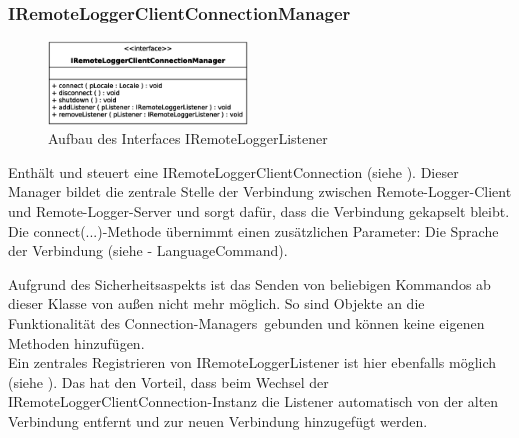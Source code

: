 \vspace{-5px}
\subsubsection{IRemoteLoggerClientConnectionManager}
\begin{figure}
	\vspace{-20px} \hspace{5px}
	\includegraphics[width=200px]{../img/CD-IRemoteLoggerClientConnectionManager.eps}
	\caption{Aufbau des Interfaces \glqq IRemoteLoggerListener\grqq}
\end{figure}
\par Enthält und steuert eine IRemoteLoggerClientConnection (siehe ). Dieser Manager bildet die zentrale Stelle der Verbindung zwischen Remote-Logger-Client und Remote-Logger-Server und sorgt dafür, dass die Verbindung gekapselt bleibt. Die \glqq connect(...)\grqq-Methode übernimmt einen zusätzlichen Parameter: Die Sprache der Verbindung (siehe  - LanguageCommand).
\par Aufgrund des Sicherheitsaspekts ist das Senden von beliebigen Kommandos ab dieser Klasse von außen nicht mehr möglich. So sind Objekte an die Funktionalität des \glqq Connection-Managers\grqq\ gebunden und können keine eigenen Methoden hinzufügen. \\
Ein zentrales Registrieren von IRemoteLoggerListener ist hier ebenfalls möglich (siehe ). Das hat den Vorteil, dass beim Wechsel der IRemoteLoggerClientConnection-Instanz die Listener  automatisch von der alten Verbindung entfernt und zur neuen Verbindung hinzugefügt werden.

\newpage

